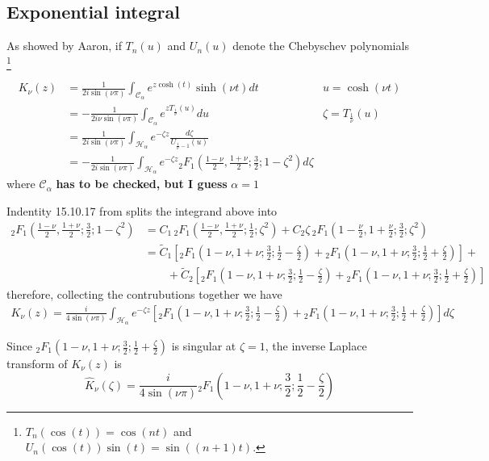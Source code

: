 \documentclass{article}
\begin{document}
\subsection{Exponential integral}
As showed by Aaron, if $T_n(u)$ and $U_n(u)$ denote the Chebyschev polynomials \footnote{$T_n(\cos(t))=\cos(nt)$ and $U_n(\cos(t))\sin(t)=\sin((n+1)t)$.} 

\begin{align*}
K_{\nu}(z)&=\frac{1}{2 i\sin(\nu \pi)}\int_{\mathcal{C}_{\alpha}}e^{z\cosh(t)}\sinh(\nu t) dt & u=\cosh(\nu t)\\
&=-\frac{1}{2i\nu\sin(\nu\pi)}\int_{\mathcal{C}_{\alpha}}e^{zT_{\frac{1}{\nu}}(u)}du & \zeta=T_{\frac{1}{\nu}}(u)\\
&=\frac{1}{2i\sin(\nu\pi)}\int_{\mathcal{H}_{\alpha}}e^{-\zeta z}\frac{d\zeta}{U_{\frac{1}{\nu}-1}(u)}\\
&=-\frac{1}{2i\sin(\nu\pi)}\int_{\mathcal{H}_{\alpha}}e^{-\zeta z}{}_2F_1\left(\frac{1-\nu}{2},\frac{1+\nu}{2};\frac{3}{2};1-\zeta^2\right)d\zeta
\end{align*}
where $\mathcal{C}_{\alpha}$ \textbf{has to be checked, but I guess } $\alpha=1$

Indentity 15.10.17 from \cite{dlmf} splits the integrand above into
\begin{align*}
{}_2F_1\left(\frac{1-\nu}{2},\frac{1+\nu}{2};\frac{3}{2};1-\zeta^2\right)&=C_1 \, {}_2F_1\left(\frac{1-\nu}{2},\frac{1+\nu}{2};\frac{1}{2};\zeta^2\right)+C_2\zeta \,{}_2F_1\left(1-\frac{\nu}{2},1+\frac{\nu}{2};\frac{3}{2};\zeta^2\right)\\
&=\tilde{C}_1\left[{}_2F_1\left({1-\nu},{1+\nu};\frac{3}{2};\frac{1}{2}-\frac{\zeta}{2}\right)+{}_2F_1\left({1-\nu},{1+\nu};\frac{3}{2};\frac{1}{2}+\frac{\zeta}{2}\right)\right]+\\
&\qquad+\tilde{C}_2\left[{}_2F_1\left({1-\nu},{1+\nu};\frac{3}{2};\frac{1}{2}-\frac{\zeta}{2}\right)+{}_2F_1\left({1-\nu},{1+\nu};\frac{3}{2};\frac{1}{2}+\frac{\zeta}{2}\right)\right]
\end{align*}
therefore, collecting the contrubutions together we have 
\begin{multline}
K_{\nu}(z)=\frac{i}{4\sin(\nu\pi)}\int_{\mathcal{H}_{\alpha}}e^{-\zeta z}\left[{}_2F_1\left({1-\nu},{1+\nu};\frac{3}{2};\frac{1}{2}-\frac{\zeta}{2}\right)+{}_2F_1\left({1-\nu},{1+\nu};\frac{3}{2};\frac{1}{2}+\frac{\zeta}{2}\right)\right] d\zeta
\end{multline}

Since ${}_2F_1\left({1-\nu},{1+\nu};\frac{3}{2};\frac{1}{2}+\frac{\zeta}{2}\right) $ is singular at $\zeta=1$, the inverse Laplace transform of $K_\nu(z)$ is 
\[
\hat{K}_{\nu}(\zeta)=\frac{i}{4\sin(\nu\pi)}{}_2F_1\left({1-\nu},{1+\nu};\frac{3}{2};\frac{1}{2}-\frac{\zeta}{2}\right)
\] 


\end{document}
